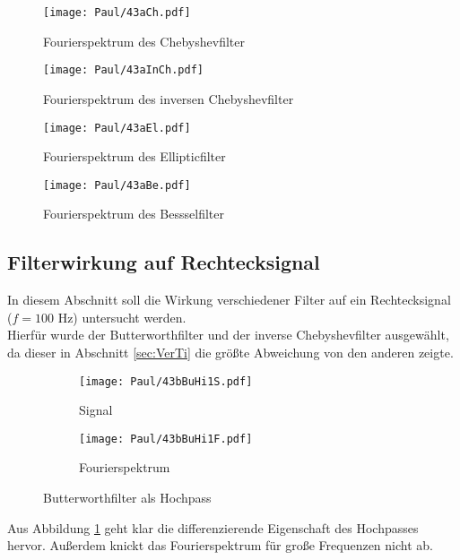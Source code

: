 \begin{figure}[h]
    \centering
    \texttt{[image: Paul/43aCh.pdf]}
    \caption{Fourierspektrum des Chebyshevfilter}
\end{figure}

\newpage
\begin{figure}[h]
    \centering
    \texttt{[image: Paul/43aInCh.pdf]}
    \caption{Fourierspektrum des inversen Chebyshevfilter}
\end{figure}


\begin{figure}[h]
    \centering
    \texttt{[image: Paul/43aEl.pdf]}
    \caption{Fourierspektrum des Ellipticfilter}
\end{figure}

\newpage
\begin{figure}[h]
    \centering
    \texttt{[image: Paul/43aBe.pdf]}
    \caption{Fourierspektrum des Bessselfilter}
\end{figure}

\newpage
\subsection{Filterwirkung auf Rechtecksignal}
In diesem Abschnitt soll die Wirkung verschiedener Filter auf ein Rechtecksignal ($f=100$ Hz) untersucht werden.\\
Hierfür wurde der Butterworthfilter und der inverse Chebyshevfilter ausgewählt, da dieser in Abschnitt \ref{sec:VerTi} die größte Abweichung von den anderen zeigte.

\begin{figure}[h]
    \centering
    \begin{subfigure}{0.45\textwidth}
        \centering
        \texttt{[image: Paul/43bBuHi1S.pdf]}
        \caption{Signal}
    \end{subfigure}
    \hfill
    \begin{subfigure}{0.45\textwidth}
        \centering
        \texttt{[image: Paul/43bBuHi1F.pdf]}
        \caption{Fourierspektrum}
    \end{subfigure}
    \caption{Butterworthfilter als Hochpass}
    \label{fig:43bBuHi1}
\end{figure}

Aus Abbildung \ref{fig:43bBuHi1} geht klar die differenzierende Eigenschaft des Hochpasses hervor. Außerdem knickt das Fourierspektrum für große Frequenzen nicht ab.

